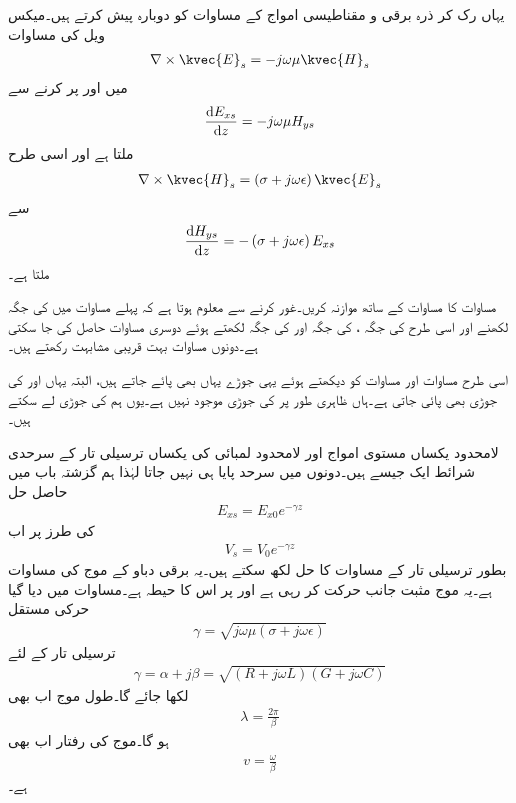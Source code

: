 یہاں رک کر ذرہ برقی و مقناطیسی امواج کے مساوات کو دوبارہ پیش کرتے ہیں۔میکس ویل کی مساوات
\begin{align*}
\nabla \times \kvec{E}_s=-j \omega \mu \kvec{H}_s
\end{align*}
میں  اور   پر کرنے سے
\begin{align}\label{مساوات_ترسیل_برقی_شدت_تفرقی_مساوات}
\frac{\dif E_{xs}}{\dif z}=-j \omega \mu H_{ys}
\end{align}
ملتا ہے اور اسی طرح
\begin{align*}
\nabla \times \kvec{H}_s=\left(\sigma+j\omega \epsilon \right)\kvec{E}_s
\end{align*}
سے
\begin{align}\label{مساوات_ترسیل_مقناطیسی_شدت_تفرقی_مساوات}
\frac{\dif H_{ys}}{\dif z}=-\left(\sigma+j \omega \epsilon \right) E_{xs}
\end{align}
ملتا ہے۔

مساوات  کا مساوات  کے ساتھ موازنہ کریں۔غور کرنے سے معلوم ہوتا ہے کہ پہلے مساوات میں  کی جگہ  لکھنے اور اسی طرح  کی جگہ ،  کی جگہ  اور  کی جگہ  لکھتے ہوئے دوسری مساوات حاصل کی جا سکتی ہے۔دونوں مساوات بہت قریبی مشابہت رکھتے ہیں۔

اسی طرح مساوات  اور مساوات  کو دیکھتے ہوئے  یہی جوڑے یہاں بھی پائے جاتے ہیں، البتہ یہاں  اور  کی جوڑی بھی پائی جاتی ہے۔ہاں ظاہری طور پر  کی جوڑی موجود نہیں ہے۔یوں ہم  کی جوڑی  لے سکتے ہیں۔

لامحدود یکساں مستوی امواج اور لامحدود لمبائی کی یکساں ترسیلی تار کے سرحدی شرائط ایک جیسے ہیں۔دونوں میں سرحد پایا ہی نہیں جاتا لہٰذا  ہم گزشتہ باب میں حاصل حل
\begin{align*}
E_{xs}=E_{x0} e^{- \gamma z}
\end{align*}
کی طرز پر اب
\begin{align}
V_s=V_0 e^{- \gamma z}
\end{align}
بطور ترسیلی تار کے مساوات کا حل لکھ سکتے ہیں۔یہ برقی دباو کے موج کی مساوات ہے۔یہ موج مثبت  جانب حرکت کر رہی ہے اور  پر اس کا حیطہ  ہے۔مساوات  میں دیا گیا حرکی مستقل
\begin{align*}
\gamma=\sqrt{j \omega \mu (\sigma +j\omega \epsilon)}
\end{align*}
ترسیلی تار کے لئے
\begin{align}
\gamma=\alpha+j\beta=\sqrt{(R+j\omega L)(G+j\omega C)}
\end{align}
لکھا جائے گا۔طول موج اب بھی
\begin{align}
\lambda=\frac{2\pi}{\beta}
\end{align}
ہو گا۔موج کی رفتار اب بھی
\begin{align}
v=\frac{\omega}{\beta}
\end{align}
ہے۔

